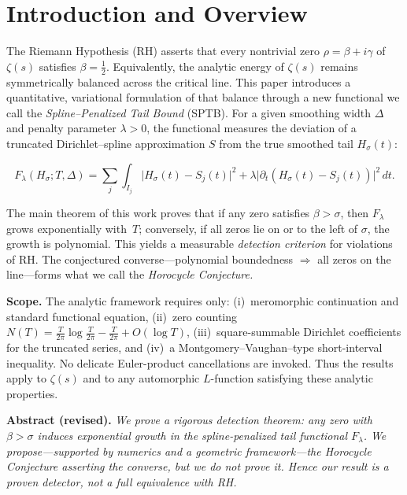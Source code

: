 
\section{Introduction and Overview}

The Riemann Hypothesis (RH) asserts that every nontrivial zero 
$\rho = \beta + i\gamma$ of $\zeta(s)$ satisfies $\beta = \tfrac{1}{2}$.
Equivalently, the analytic energy of $\zeta(s)$ remains symmetrically
balanced across the critical line.  
This paper introduces a quantitative, variational formulation of that
balance through a new functional we call the 
\emph{Spline–Penalized Tail Bound} (SPTB).  
For a given smoothing width $\Delta$ and penalty parameter $\lambda>0$,
the functional measures the deviation of a truncated Dirichlet–spline
approximation $S$ from the true smoothed tail $H_\sigma(t)$:

\begin{equation}
F_\lambda(H_\sigma;T,\Delta)
    = \sum_{j}\int_{I_j}
      \bigl|H_\sigma(t)-S_j(t)\bigr|^2
      + \lambda\bigl|\partial_t(H_\sigma(t)-S_j(t))\bigr|^2\,dt.
\tag{1.1}
\label{eq:SPTB}
\end{equation}

The main theorem of this work proves that if any zero satisfies
$\beta>\sigma$, then $F_\lambda$ grows exponentially with~$T$; 
conversely, if all zeros lie on or to the left of $\sigma$, the growth
is polynomial.  
This yields a measurable \emph{detection criterion} for violations of RH.
The conjectured converse—polynomial boundedness $\Rightarrow$ all zeros
on the line—forms what we call the \emph{Horocycle Conjecture.}

\medskip
\noindent
\textbf{Scope.}
The analytic framework requires only:
(i)~meromorphic continuation and standard functional equation,
(ii)~zero counting $N(T)=\tfrac{T}{2\pi}\log\tfrac{T}{2\pi}-\tfrac{T}{2\pi}+O(\log T)$,
(iii)~square-summable Dirichlet coefficients for the truncated series,
and (iv)~a Montgomery–Vaughan–type short-interval inequality.
No delicate Euler-product cancellations are invoked.
Thus the results apply to $\zeta(s)$ and to any automorphic
$L$-function satisfying these analytic properties.

\medskip
\noindent
\textbf{Abstract (revised).}
\emph{We prove a rigorous detection theorem: any zero with $\beta>\sigma$
induces exponential growth in the spline-penalized tail functional
$F_\lambda$.  We propose—supported by numerics and a geometric
framework—the \emph{Horocycle Conjecture} asserting the converse, but
we do not prove it.  Hence our result is a proven detector, not a full
equivalence with RH.}

